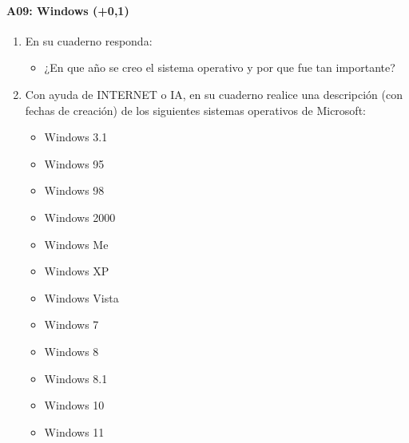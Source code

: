 \documentclass[letterpaper,10pt,spanish]{sphinxmanual}
\begin{document}
\paragraph{A09: Windows (+0,1)}
\label{\detokenize{cursos/informatica10/periodo01/G01:a09-windows-0-1}}
\sphinxAtStartPar
{}
\begin{enumerate}
%
\item {} 
\sphinxAtStartPar
En su cuaderno responda:
\begin{itemize}
\item {} 
\sphinxAtStartPar
¿En que año se creo el sistema operativo  y por que fue tan importante?

\end{itemize}

\item {} 
\sphinxAtStartPar
Con ayuda de INTERNET o IA, en su cuaderno realice una descripción (con fechas de creación) de los siguientes sistemas operativos de Microsoft:
\begin{itemize}
\item {} 
\sphinxAtStartPar
Windows 3.1

\item {} 
\sphinxAtStartPar
Windows 95

\item {} 
\sphinxAtStartPar
Windows 98

\item {} 
\sphinxAtStartPar
Windows 2000

\item {} 
\sphinxAtStartPar
Windows Me

\item {} 
\sphinxAtStartPar
Windows XP

\item {} 
\sphinxAtStartPar
Windows Vista

\item {} 
\sphinxAtStartPar
Windows 7

\item {} 
\sphinxAtStartPar
Windows 8

\item {} 
\sphinxAtStartPar
Windows 8.1

\item {} 
\sphinxAtStartPar
Windows 10

\item {} 
\sphinxAtStartPar
Windows 11

\end{itemize}

\end{enumerate}
\end{document}
